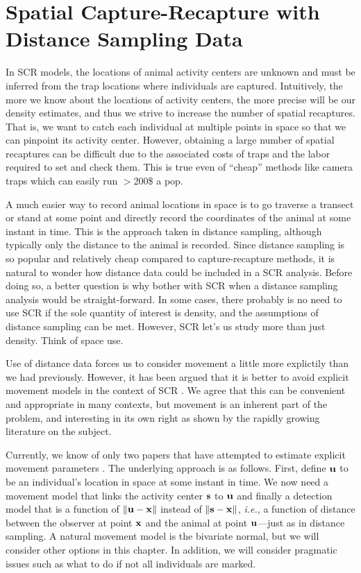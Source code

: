 


\chapter{Spatial Capture-Recapture with Distance Sampling Data}
\label{chapt.scrds}

\vspace{0.3cm}



In SCR models, the locations of animal activity
centers are unknown and must be inferred from the trap locations where
individuals are captured. Intuitively, the more
we know about the locations of activity centers, the more precise will
be our density estimates, and thus we strive to increase the
number of spatial recaptures. That is, we want to catch each
individual at multiple points in space so that we can pinpoint
its activity center. However, obtaining a large
number of spatial recaptures can be difficult due to the associated costs
of traps and the labor required to set and check them. This is true
even of ``cheap'' methods like camera traps which can easily run
$>$200\$ a pop.

A much easier way to record
animal locations in space is to go traverse a transect or stand at some
point and directly record the coordinates of the animal at some
instant in time. This is the approach taken in distance sampling,
although typically only the distance to the animal is
recorded. Since distance sampling is so popular and relatively cheap
compared to capture-recapture methods, it is natural to wonder how
distance data could be included in a SCR analysis. Before doing so, a better
question is why bother with SCR when a distance sampling analysis would
be straight-forward. In some cases, there probably is no
need to use SCR if the sole quantity of interest is density, and the
assumptions of distance sampling can be met. However, SCR let's us
study more than just density. Think of space use.

Use of distance data
forces us to consider movement a little more explictily than we had
previously. However, it has been argued that it is better to avoid
explicit movement models in the context of SCR
\citep{borchers:2010}. We agree that this can be
convenient and appropriate in many contexts, but movement is an
inherent part of the problem, and interesting in
its own right as shown by the rapidly growing literature on the
subject.

Currently, we know of only two papers that have attempted
to estimate explicit movement parameters
\citep{royle_young:2008,royle_etal:2009jae}. The underlying approach
is as follows. First, define $\bf u$ to be an individual's location in
space at some instant in time. We now need a movement model that links
the activity center $\bf s$ to $\bf u$ and finally a detection model that
is a function of $\bf \| u - x\|$ instead of $\bf \|s - x\|$,
\emph{i.e.}, a function of distance between the observer
at point $\bf x$ and the animal at point $\bf u$---just as in distance
sampling. A natural movement model is the bivariate normal, but we
will consider other options in this chapter. In addition, we will
consider pragmatic issues such as what to do if not all individuals
are marked.


